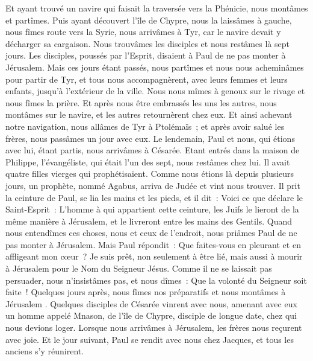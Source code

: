 \begin{multicols}{2}
Et ayant trouvé un navire qui faisait la traversée vers la Phénicie, nous montâmes et partîmes.
Puis ayant découvert l'île de Chypre, nous la laissâmes à gauche, nous fîmes route vers la Syrie, nous arrivâmes à Tyr, car le navire devait y décharger sa cargaison.
Nous trouvâmes les disciples et nous restâmes là sept jours. Les disciples, poussés par l'Esprit, disaient à Paul de ne pas monter à Jérusalem.
Mais ces jours étant passés, nous partîmes et nous nous acheminâmes pour partir de Tyr, et tous nous accompagnèrent, avec leurs femmes et leurs enfants, jusqu'à l'extérieur de la ville. Nous nous mîmes à genoux sur le rivage et nous fîmes la prière.
Et après nous être embrassés les uns les autres, nous montâmes sur le navire, et les autres retournèrent chez eux.
Et ainsi achevant notre navigation, nous allâmes de Tyr à Ptolémaïs~; et après avoir salué les frères, nous passâmes un jour avec eux.
Le lendemain, Paul et nous, qui étions avec lui, étant partis, nous arrivâmes à Césarée. Etant entrés dans la maison de Philippe, l'évangéliste, qui était l'un des sept, nous restâmes chez lui.
Il avait quatre filles vierges qui prophétisaient.
Comme nous étions là depuis plusieurs jours, un prophète, nommé Agabus, arriva de Judée
et vint nous trouver. Il prit la ceinture de Paul, se lia les mains et les pieds, et il dit~: Voici ce que déclare le Saint-Esprit~: L'homme à qui appartient cette ceinture, les Juifs le lieront de la même manière à Jérusalem, et le livreront entre les mains des Gentils.
Quand nous entendîmes ces choses, nous et ceux de l'endroit, nous priâmes Paul de ne pas monter à Jérusalem.
Mais Paul répondit~: Que faites-vous en pleurant et en affligeant mon cœur~? Je suis prêt, non seulement à être lié, mais aussi à mourir à Jérusalem pour le Nom du Seigneur Jésus.
Comme il ne se laissait pas persuader, nous n'insistâmes pas, et nous dîmes~: Que la volonté du Seigneur soit faite~!
Quelques jours après, nous fîmes nos préparatifs et nous montâmes à Jérusalem .
Quelques disciples de Césarée vinrent avec nous, amenant avec eux un homme appelé Mnason, de l'île de Chypre, disciple de longue date, chez qui nous devions loger.
Lorsque nous arrivâmes à Jérusalem, les frères nous reçurent avec joie.
Et le jour suivant, Paul se rendit avec nous chez Jacques, et tous les anciens s'y réunirent.

\end{multicols}
